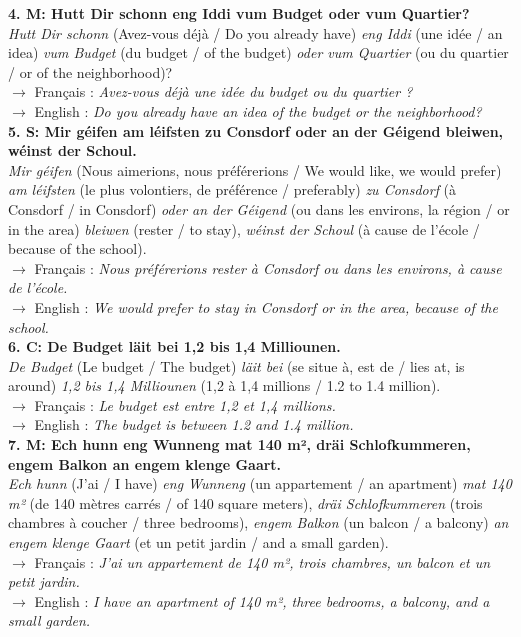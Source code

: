 \noindent\textbf{4. M: Hutt Dir schonn eng Iddi vum Budget oder vum Quartier?}\\
\textit{Hutt Dir schonn} (Avez-vous déjà / Do you already have) \textit{eng Iddi} (une idée / an idea) \textit{vum Budget} (du budget / of the budget) \textit{oder vum Quartier} (ou du quartier / or of the neighborhood)?\\
$\rightarrow$ Français : \textit{Avez-vous déjà une idée du budget ou du quartier ?}\\
$\rightarrow$ English : \textit{Do you already have an idea of the budget or the neighborhood?}\\[0.5em]

\noindent\textbf{5. S: Mir géifen am léifsten zu Consdorf oder an der Géigend bleiwen, wéinst der Schoul.}\\
\textit{Mir géifen} (Nous aimerions, nous préférerions / We would like, we would prefer) \textit{am léifsten} (le plus volontiers, de préférence / preferably) \textit{zu Consdorf} (à Consdorf / in Consdorf) \textit{oder an der Géigend} (ou dans les environs, la région / or in the area) \textit{bleiwen} (rester / to stay), \textit{wéinst der Schoul} (à cause de l'école / because of the school).\\
$\rightarrow$ Français : \textit{Nous préférerions rester à Consdorf ou dans les environs, à cause de l'école.}\\
$\rightarrow$ English : \textit{We would prefer to stay in Consdorf or in the area, because of the school.}\\[0.5em]

\noindent\textbf{6. C: De Budget läit bei 1,2 bis 1,4 Milliounen.}\\
\textit{De Budget} (Le budget / The budget) \textit{läit bei} (se situe à, est de / lies at, is around) \textit{1,2 bis 1,4 Milliounen} (1,2 à 1,4 millions / 1.2 to 1.4 million).\\
$\rightarrow$ Français : \textit{Le budget est entre 1,2 et 1,4 millions.}\\
$\rightarrow$ English : \textit{The budget is between 1.2 and 1.4 million.}\\[0.5em]

\noindent\textbf{7. M: Ech hunn eng Wunneng mat 140 m², dräi Schlofkummeren, engem Balkon an engem klenge Gaart.}\\
\textit{Ech hunn} (J'ai / I have) \textit{eng Wunneng} (un appartement / an apartment) \textit{mat 140 m²} (de 140 mètres carrés / of 140 square meters), \textit{dräi Schlofkummeren} (trois chambres à coucher / three bedrooms), \textit{engem Balkon} (un balcon / a balcony) \textit{an engem klenge Gaart} (et un petit jardin / and a small garden).\\
$\rightarrow$ Français : \textit{J'ai un appartement de 140 m², trois chambres, un balcon et un petit jardin.}\\
$\rightarrow$ English : \textit{I have an apartment of 140 m², three bedrooms, a balcony, and a small garden.}\\[0.5em]

